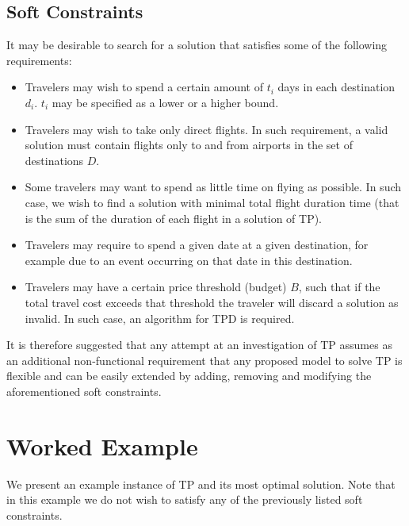 \documentclass{article}
\theoremstyle{definition}
\begin{document}
\subsection{Soft Constraints}
It may be desirable to search for a solution that satisfies some of the following requirements:
\begin{itemize}
\item Travelers may wish to spend a certain amount of $t_{i}$ days in each destination $d_{i}$. $t_{i}$ may be specified as a lower or a higher bound.
\item Travelers may wish to take only direct flights. In such requirement, a valid solution must contain flights only to and from airports in the set of destinations $D$.
\item Some travelers may want to spend as little time on flying as possible. In such case, we wish to find a solution with minimal total flight duration time (that is the sum of the duration of each flight in a solution of TP).
\item Travelers may require to spend a given date at a given destination, for example due to an event occurring on that date in this destination.
\item Travelers may have a certain price threshold (budget) $B$, such that if the total travel cost exceeds that threshold the traveler will discard a solution as invalid. In such case, an algorithm for TPD is required.
\end{itemize}

It is therefore suggested that any attempt at an investigation of TP assumes as an additional non-functional requirement that any proposed model to solve TP is flexible and can be easily extended by adding, removing and modifying the aforementioned soft constraints.

\section{Worked Example}
We present an example instance of TP and its most optimal solution. Note that in this example we do not wish to satisfy any of the previously listed soft constraints.
\end{document}
